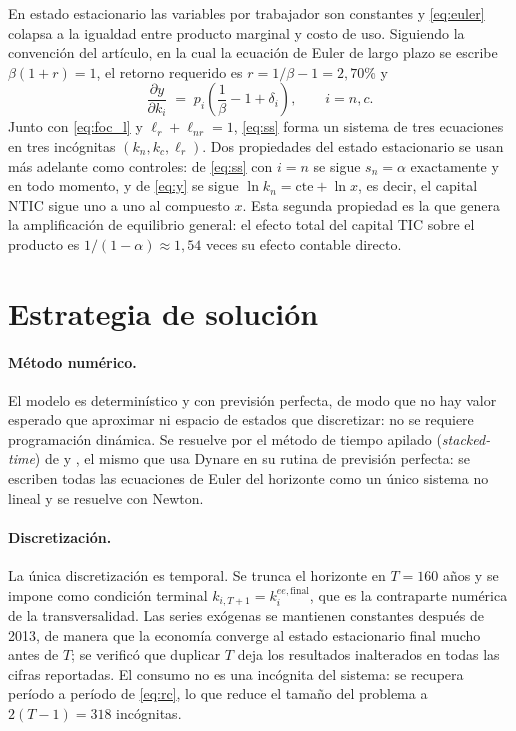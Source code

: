 \documentclass[12pt,letterpaper]{article}
\newcommand{\lr}{\ell_{r}}
\newcommand{\lnr}{\ell_{nr}}
\begin{document}
En estado estacionario las variables por trabajador son constantes y \eqref{eq:euler}
colapsa a la igualdad entre producto marginal y costo de uso. Siguiendo la convención
del artículo, en la cual la ecuación de Euler de largo plazo se escribe
$\beta(1+r)=1$, el retorno requerido es $r=1/\beta-1=2{,}70\%$ y
\begin{equation}
\frac{\partial y}{\partial k_{i}} \;=\; p_{i}\left(\frac{1}{\beta}-1+\delta_{i}\right),
\qquad i=n,c.
\label{eq:ss}
\end{equation}
Junto con \eqref{eq:foc_l} y $\lr+\lnr=1$, \eqref{eq:ss} forma un sistema de tres
ecuaciones en tres incógnitas $(k_{n},k_{c},\lr)$. Dos propiedades del estado
estacionario se usan más adelante como controles: de \eqref{eq:ss} con $i=n$ se sigue
$s_{n}=\alpha$ exactamente y en todo momento, y de \eqref{eq:y} se sigue
$\ln k_{n} = \text{cte} + \ln x$, es decir, el capital NTIC sigue uno a uno al
compuesto $x$. Esta segunda propiedad es la que genera la amplificación de equilibrio
general: el efecto total del capital TIC sobre el producto es $1/(1-\alpha)\approx1{,}54$
veces su efecto contable directo.

\section{Estrategia de solución}

\paragraph{Método numérico.}
El modelo es determinístico y con previsión perfecta, de modo que no hay valor
esperado que aproximar ni espacio de estados que discretizar: no se requiere
programación dinámica. Se resuelve por el método de tiempo apilado
(\emph{stacked-time}) de \citet{laffargue1990} y \citet{boucekkine1995}, el mismo que
usa Dynare en su rutina de previsión perfecta: se escriben todas las ecuaciones de
Euler del horizonte como un único sistema no lineal y se resuelve con Newton.

\paragraph{Discretización.}
La única discretización es temporal. Se trunca el horizonte en $T=160$ años y se impone
como condición terminal $k_{i,T+1}=k_{i}^{ee,\text{final}}$, que es la contraparte
numérica de la transversalidad. Las series exógenas se mantienen constantes después de
2013, de manera que la economía converge al estado estacionario final mucho antes de
$T$; se verificó que duplicar $T$ deja los resultados inalterados en todas las cifras
reportadas. El consumo no es una incógnita del sistema: se recupera período a período
de \eqref{eq:rc}, lo que reduce el tamaño del problema a $2(T-1)=318$ incógnitas.
\end{document}
